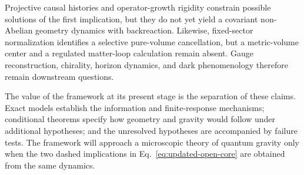 Projective causal histories and operator-growth rigidity constrain possible
solutions of the first implication, but they do not yet yield a covariant
non-Abelian geometry dynamics with backreaction.  Likewise, fixed-sector
normalization identifies a selective pure-volume cancellation, but a
metric-volume center and a regulated matter-loop calculation remain absent.
Gauge reconstruction, chirality, horizon dynamics, and dark phenomenology
therefore remain downstream questions.

The value of the framework at its present stage is the separation of these
claims.  Exact models establish the information and finite-response
mechanisms; conditional theorems specify how geometry and gravity would
follow under additional hypotheses; and the unresolved hypotheses are
accompanied by failure tests.  The framework will approach a microscopic
theory of quantum gravity only when the two dashed implications in
Eq.~\eqref{eq:updated-open-core} are obtained from the same dynamics.
